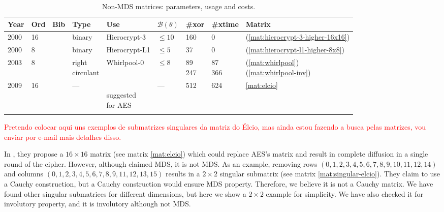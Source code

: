 \begin{footnotesize}
\begin{longtable}[c]{|l|l|l|l|l|l|l|l|l|}
\hline
\textbf{Year} & \textbf{Ord} & \textbf{Bib} & \textbf{Type} & \textbf{Use} & \textbf{$\mathcal{B}(\theta)$} & \textbf{\#xor} & \textbf{\#xtime} & \textbf{Matrix} \\ \hline
\endhead

2000 & 16 & \cite{Hierocrypt2000} & binary & Hierocrypt-3 & $\leq 10$ & 160 & 0 & (\ref{mat:hierocrypt-3-higher-16x16}) \\ \hline
2000 & 8 & \cite{Hierocrypt-L1-2000} & binary & Hierocrypt-L1 & $\leq 5$ & 37 & 0 & (\ref{mat:hierocrypt-l1-higher-8x8}) \\ \hline
2003 & 8 & \cite{Whirlpool2003} & \shortstack{right \\ circulant} & Whirlpool-0 & $\leq 8$ & \shortstack{89\\247} & \shortstack{87\\366} & \shortstack{(\ref{mat:whirlpool})\\(\ref{mat:whirlpool-inv})} \\ \hline
2009 & 16 & \cite{Nakahara2009} & --- & \shortstack{\\ suggested \\ for AES} & --- & 512 & 624 & \eqref{mat:elcio} \\ \hline

\caption{Non-MDS matrices: parameters, usage and costs.}\label{tbl:non-mds-list}
\end{longtable}
\end{footnotesize}

\textcolor{red}{Pretendo colocar aqui uns exemplos de submatrizes singulares da matriz do Élcio, mas ainda estou fazendo a busca pelas matrizes, vou enviar por e-mail mais detalhes disso.}

In \cite{Nakahara2009}, they propose a $16 \times 16$ matrix (see matrix \ref{mat:elcio}) which could replace AES's matrix and result in complete diffusion in a single round of the cipher. However, although claimed MDS, it is not MDS. As an example, removing rows $(0, 1, 2, 3, 4, 5, 6, 7, 8, 9, 10, 11, 12, 14)$ and columns $(0, 1, 2, 3, 4, 5, 6, 7, 8, 9, 11, 12, 13, 15)$ results in a $2\times2$ singular submatrix (see matrix \eqref{mat:singular-elcio}). They claim to use a Cauchy construction, but a Cauchy construction would ensure MDS property. Therefore, we believe it is not a Cauchy matrix. We have found other singular submatrices for different dimensions, but here we show a $2\times2$ example for simplicity. We have also checked it for involutory property, and it is involutory although not MDS.


